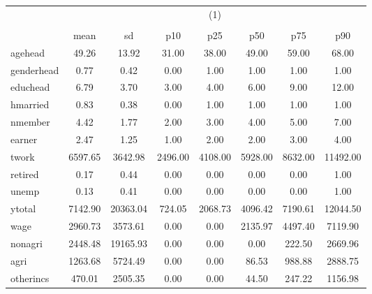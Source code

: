 {
\def\sym#1{\ifmmode^{#1}\else\(^{#1}\)\fi}
\begin{tabular}{l*{1}{ccccccc}}
\hline\hline
            &\multicolumn{7}{c}{(1)}                                                                   \\
            &\multicolumn{7}{c}{}                                                                      \\
            &        mean&          sd&         p10&         p25&         p50&         p75&         p90\\
\hline
agehead     &       49.26&       13.92&       31.00&       38.00&       49.00&       59.00&       68.00\\
genderhead  &        0.77&        0.42&        0.00&        1.00&        1.00&        1.00&        1.00\\
educhead    &        6.79&        3.70&        3.00&        4.00&        6.00&        9.00&       12.00\\
hmarried    &        0.83&        0.38&        0.00&        1.00&        1.00&        1.00&        1.00\\
nmember     &        4.42&        1.77&        2.00&        3.00&        4.00&        5.00&        7.00\\
earner      &        2.47&        1.25&        1.00&        2.00&        2.00&        3.00&        4.00\\
twork       &     6597.65&     3642.98&     2496.00&     4108.00&     5928.00&     8632.00&    11492.00\\
retired     &        0.17&        0.44&        0.00&        0.00&        0.00&        0.00&        1.00\\
unemp       &        0.13&        0.41&        0.00&        0.00&        0.00&        0.00&        1.00\\
ytotal      &     7142.90&    20363.04&      724.05&     2068.73&     4096.42&     7190.61&    12044.50\\
wage        &     2960.73&     3573.61&        0.00&        0.00&     2135.97&     4497.40&     7119.90\\
nonagri     &     2448.48&    19165.93&        0.00&        0.00&        0.00&      222.50&     2669.96\\
agri        &     1263.68&     5724.49&        0.00&        0.00&       86.53&      988.88&     2888.75\\
otherincs   &      470.01&     2505.35&        0.00&        0.00&       44.50&      247.22&     1156.98\\

\end{tabular}}
